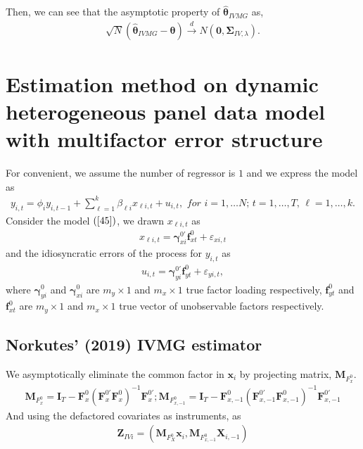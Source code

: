 \documentclass[12pt,a4paper,hyperref]{article}
\begin{document}
Then, we can see that the asymptotic property of $\hat{\boldsymbol{\theta}}_{IVMG} $ as,
\begin{align}
\sqrt{N}\left(\hat{\boldsymbol{\theta}}_{IVMG}-\boldsymbol{\theta}  \right)\overset{d}{\to} N\left(\boldsymbol{0},\boldsymbol{\Sigma}_{IV,\lambda} \right).
\end{align}




\section{Estimation method on dynamic heterogeneous panel data model with  multifactor error structure}
For convenient, we assume the number of regressor is $1$ and we express the model as
\begin{align}
y_{i,t}=\phi_{i} y_{i,t-1}+ \sum^{k}_{\ell=1}\beta_{\ell i}x_{\ell i,t}+u_{i,t}, \,\, for\,\,i=1,\ldots N;\,t=1,\ldots,T, \, \ell=1,\ldots, k. \label{46}
\end{align}
Consider the model $(\ref{45})$, we drawn $x_{\ell i,t}$ as
\begin{align}
x_{\ell i,t}=\boldsymbol{\gamma}^{0'}_{xi}\boldsymbol{f}^{0}_{xt}+\varepsilon_{xi,t}
\end{align}
and the idiosyncratic errors of the process for $y_{i,t}$ as
\begin{align}
u_{i,t}=\boldsymbol{\gamma}^{0'}_{yi}\boldsymbol{f}^{0}_{yt}+\varepsilon_{yi,t},
\end{align}
where $\boldsymbol{\gamma}^{0}_{yi}$ and $\boldsymbol{\gamma}^{0}_{xi}$ are $m_{y}\times 1$ and $m_{x}\times 1$ true
 factor loading respectively, $\boldsymbol{f}^{0}_{yt}$  and  $\boldsymbol{f}^{0}_{xt}$ are  $m_{y}\times 1$ and $m_{x}\times 1$ true vector of unobservable factors respectively.
\subsection{Norkutes' (2019) IVMG estimator}
 We asymptotically eliminate the common factor in $\boldsymbol{x}_{i}$ by projecting matrix, $\boldsymbol{M}_{F^{0}_{x}}$.
 \begin{align}
 \boldsymbol{M}_{F^{0}_{x}}=\boldsymbol{I}_{T}-\boldsymbol{F}^{0}_{x}\left(\boldsymbol{F}^{0'}_{x}\boldsymbol{F}^{0}_{x}  \right)^{-1}\boldsymbol{F}^{0'}_{x} ; \boldsymbol{M}_{F^{0}_{x,-1}}=\boldsymbol{I}_{T}-\boldsymbol{F}^{0}_{x,-1}\left(\boldsymbol{F}^{0'}_{x,-1}\boldsymbol{F}^{0}_{x,-1}  \right)^{-1}\boldsymbol{F}^{0'}_{x,-1}
 \end{align}
And using the defactored covariates as instruments, as
\begin{align}
\boldsymbol{Z}_{IVi}=\left(\boldsymbol{M}_{F^{0}_{X}}\boldsymbol{x}_{i}, \boldsymbol{M}_{F^{0}_{x,-1}}\boldsymbol{X}_{i,-1}  \right)
\end{align}
\end{document}
